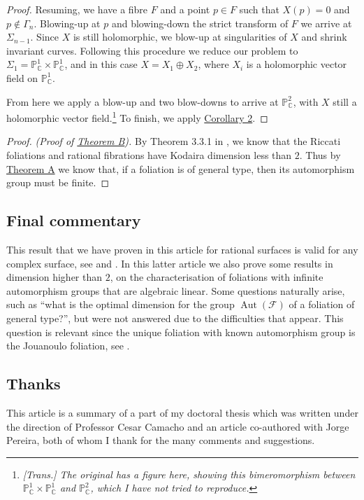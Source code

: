 \documentclass[british]{article}
\begin{document}
\begin{proof}
Resuming, we have a fibre \(F\) and a point \(p\in F\) such that
\(X(p)=0\) and \(p\not\in\Gamma_n\). Blowing-up at \(p\) and
blowing-down the strict transform of \(F\) we arrive at
\(\Sigma_{n-1}\). Since \(X\) is still holomorphic, we blow-up at
singularities of \(X\) and shrink invariant curves. Following this
procedure we reduce our problem to
\(\Sigma_1=\mathbb{P}_\mathbb{C}^1\times\mathbb{P}_\mathbb{C}^1\), and
in this case \(X=X_1\oplus X_2\), where \(X_i\) is a holomorphic vector
field on \(\mathbb{P}_\mathbb{C}^1\).

From here we apply a blow-up and two blow-downs to arrive at
\(\mathbb{P}_\mathbb{C}^2\), with \(X\) still a holomorphic vector
field.\footnote{\emph{{[}Trans.{]} The original has a figure here,
  showing this bimeromorphism between
  \(\mathbb{P}_\mathbb{C}^1\times\mathbb{P}_\mathbb{C}^1\) and
  \(\mathbb{P}_\mathbb{C}^2\), which I have not tried to reproduce.}} To
finish, we apply \hyperref[corollary-2]{Corollary 2}.
\end{proof}

\begin{proof}
\emph{(Proof of \hyperref[theorem-B]{Theorem B}).} By Theorem 3.3.1 in
\autocite{12}, we know that the Riccati foliations and rational
fibrations have Kodaira dimension less than \(2\). Thus by
\hyperref[theorem-A]{Theorem A} we know that, if a foliation is of
general type, then its automorphism group must be finite.
\end{proof}

\subsection{Final commentary}\label{section-4}

This result that we have proven in this article for rational surfaces is
valid for any complex surface, see \autocite{6} and \autocite{7}. In
this latter article we also prove some results in dimension higher than
\(2\), on the characterisation of foliations with infinite automorphism
groups that are algebraic linear. Some questions naturally arise, such
as ``what is the optimal dimension for the group
\(\operatorname{Aut}({\mathcal{F}})\) of a foliation of general type?'',
but were not answered due to the difficulties that appear. This question
is relevant since the unique foliation with known automorphism group is
the Jouanoulo foliation, see \autocite{9}.

\subsection{Thanks}\label{section-5}

This article is a summary of a part of my doctoral thesis \autocite{6}
which was written under the direction of Professor Cesar Camacho and an
article co-authored with Jorge Pereira, both of whom I thank for the
many comments and suggestions.


\nocite{*}
\printbibliography[heading=bibintoc,title=Bibliography]
\end{document}
